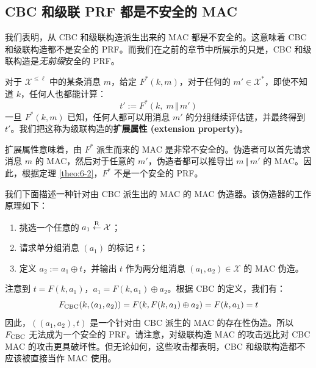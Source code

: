 \subsection{CBC 和级联 PRF 都是不安全的 MAC}

我们表明，从 CBC 和级联构造派生出来的 MAC 都是不安全的。这意味着 CBC 和级联构造都不是安全的 PRF。而我们在之前的章节中所展示的只是，CBC 和级联构造是\emph{无前缀}安全的 PRF。

\begin{snote}[对级联构造的扩展攻击。]
对于 $\mathcal{X}^{\leq\ell}$ 中的某条消息 $m$，给定 $F^*(k,m)$，对于任何的 $m'\in\mathcal{X}^*$，即使不知道 $k$，任何人也都能计算：
\begin{equation}\label{eq:6-16}
t':=F^*(k,\;m\,\Vert\,m')
\end{equation}
一旦 $F^*(k,m)$ 已知，任何人都可以用消息 $m'$ 的分组继续评估链，并最终得到 $t'$。我们把这称为级联构造的\textbf{扩展属性 (extension property)}。

扩展属性意味着，由 $F^*$ 派生而来的 MAC 是非常不安全的。伪造者可以首先请求消息 $m$ 的 MAC，然后对于任意的 $m'$，伪造者都可以推导出 $m\,\Vert\,m'$ 的 MAC。因此，根据定理 \ref{theo:6-2}，$F^*$ 不是一个安全的 PRF。
\end{snote}

\begin{snote}
我们下面描述一种针对由 CBC 派生出的 MAC 的 MAC 伪造器。该伪造器的工作原理如下：
\begin{enumerate}
	\item 挑选一个任意的 $a_1\overset{\rm R}\leftarrow\mathcal{X}$；
	\item 请求单分组消息 $(a_1)$ 的标记 $t$；
	\item 定义 $a_2:=a_1\oplus t$，并输出 $t$ 作为两分组消息 $(a_1,a_2)\in\mathcal{X}$ 的 MAC 伪造。
\end{enumerate}
注意到 $t=F(k,a_1)$，$a_1=F(k,a_1)\oplus a_2$。根据 CBC 的定义，我们有：
\[
F_{\rm CBC}(k,(a_1,a_2))=F(k,F(k,a_1)\oplus a_2)=F(k,a_1)=t
\]
因此，$((a_1,a_2),t)$  是一个针对由 CBC 派生的 MAC 的存在性伪造。所以 $F_{\rm CBC}$ 无法成为一个安全的 PRF。请注意，对级联构造 MAC 的攻击远比对 CBC MAC 的攻击更具破坏性。但无论如何，这些攻击都表明，CBC 和级联构造都不应该被直接当作 MAC 使用。
\end{snote}